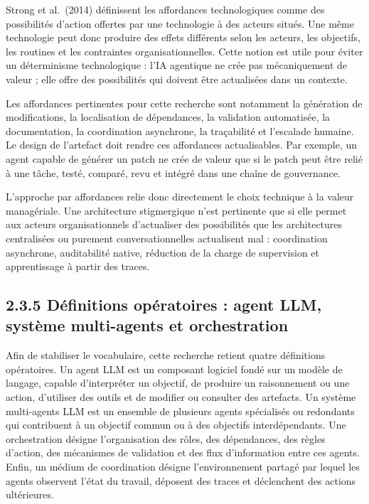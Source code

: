 Strong et al.~(2014) définissent les affordances technologiques comme des possibilités d'action offertes par une technologie à des acteurs situés. Une même technologie peut donc produire des effets différents selon les acteurs, les objectifs, les routines et les contraintes organisationnelles. Cette notion est utile pour éviter un déterminisme technologique : l'IA agentique ne crée pas mécaniquement de valeur ; elle offre des possibilités qui doivent être actualisées dans un contexte.

Les affordances pertinentes pour cette recherche sont notamment la génération de modifications, la localisation de dépendances, la validation automatisée, la documentation, la coordination asynchrone, la traçabilité et l'escalade humaine. Le design de l'artefact doit rendre ces affordances actualisables. Par exemple, un agent capable de générer un patch ne crée de valeur que si le patch peut être relié à une tâche, testé, comparé, revu et intégré dans une chaîne de gouvernance.

L'approche par affordances relie donc directement le choix technique à la valeur managériale. Une architecture stigmergique n'est pertinente que si elle permet aux acteurs organisationnels d'actualiser des possibilités que les architectures centralisées ou purement conversationnelles actualisent mal : coordination asynchrone, auditabilité native, réduction de la charge de supervision et apprentissage à partir des traces.

\subsection{2.3.5 Définitions opératoires : agent LLM, système multi-agents et orchestration}\label{duxe9finitions-opuxe9ratoires-agent-llm-systuxe8me-multi-agents-et-orchestration}

Afin de stabiliser le vocabulaire, cette recherche retient quatre définitions opératoires. Un agent LLM est un composant logiciel fondé sur un modèle de langage, capable d'interpréter un objectif, de produire un raisonnement ou une action, d'utiliser des outils et de modifier ou consulter des artefacts. Un système multi-agents LLM est un ensemble de plusieurs agents spécialisés ou redondants qui contribuent à un objectif commun ou à des objectifs interdépendants. Une orchestration désigne l'organisation des rôles, des dépendances, des règles d'action, des mécanismes de validation et des flux d'information entre ces agents. Enfin, un médium de coordination désigne l'environnement partagé par lequel les agents observent l'état du travail, déposent des traces et déclenchent des actions ultérieures.


